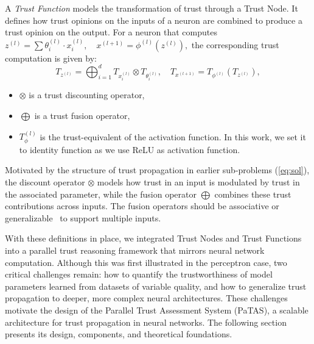 \begin{definition}\label{def:trustfunc}
A \emph{Trust Function} models the transformation of trust through a Trust Node. It defines how trust opinions on the inputs of a neuron are combined to produce a trust opinion on the output. 
For a neuron that computes
\(
z^{(l)} = \sum \theta^{(l)}_i \cdot x^{(l)}_i, \quad x^{(l+1)} = \phi^{(l)}(z^{(l)}),
\)
the corresponding trust computation is given by:
\begin{equation}
T_{z^{(l)}} = \bigoplus_{i=1}^{d} T_{x_{i}^{(l)}} \otimes T_{\theta_{i}^{(l)}}, \quad
T_{x^{(l+1)}} = T_{\phi^{(l)}}(T_{z^{(l)}}),
\label{eq:layerprop}
\end{equation}
\begin{itemize}
    \item \( \otimes \) is a trust discounting operator,
    \item \(\bigoplus\) is a trust fusion operator,
    \item \( T_{\phi}^{(l)} \) is the trust-equivalent of the activation function. In this work, we set it to identity function as we use ReLU as activation function.
\end{itemize}
\end{definition}

Motivated by the structure of trust propagation in earlier sub-problems (\cref{eq:sol}), the discount operator \( \otimes \) models how trust in an input is modulated by trust in the associated parameter, while the fusion operator \( \bigoplus \) combines these trust contributions across inputs. The fusion operators should be associative or generalizable~\cite{vanderheijden2018multisourcefusionoperationssubjective} to support multiple inputs.

With these definitions in place, we integrated Trust Nodes and Trust Functions into a parallel trust reasoning framework that mirrors neural network computation. Although this was first illustrated in the perceptron case, two critical challenges remain: how to quantify the trustworthiness of model parameters learned from datasets of variable quality, and how to generalize trust propagation to deeper, more complex neural architectures. These challenges motivate the design of the Parallel Trust Assessment System (PaTAS), a scalable architecture for trust propagation in neural networks. The following section presents its design, components, and theoretical foundations.